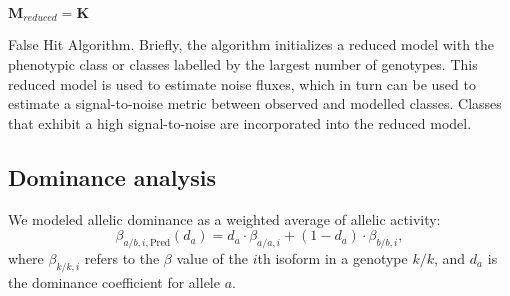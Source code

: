 \begin{algorithm}[H]
  \DontPrintSemicolon{}
  \BlankLine{}

  $\mathbf{M}_{reduced} = \mathbf{K}$\;

  \;
  \BlankLine{}\;
  \caption{False Hit Algorithm. Briefly, the algorithm initializes a reduced
           model with the phenotypic class or classes labelled by the largest
           number of genotypes. This reduced model is used to estimate noise
           fluxes, which in turn can be used to estimate a signal-to-noise metric
           between observed and modelled classes. Classes that exhibit a high
           signal-to-noise are incorporated into the reduced model.}
  \label{alg:false}
\end{algorithm}


\subsection*{Dominance analysis}
\label{subsec:dominance}
We modeled allelic dominance as a weighted average of allelic activity:
\begin{equation}
  \beta_{a/b,i,\text{Pred}}(d_a) = d_a\cdot \beta_{a/a,i} +
                                   (1-d_a)\cdot \beta_{b/b,i},
\end{equation}
where $\beta_{k/k, i}$ refers to the $\beta$ value of the $i$th isoform in a
genotype $k/k$, and $d_a$ is the dominance coefficient for allele $a$.

